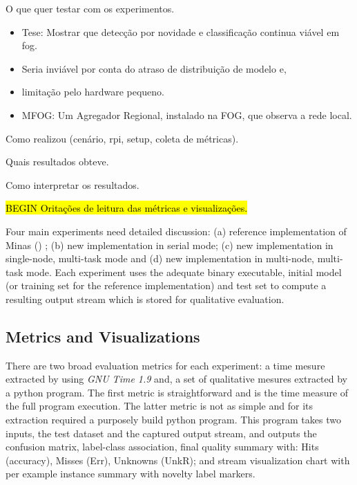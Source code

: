 \documentclass[conference]{IEEEtran}
\begin{document}

O que quer testar com os experimentos.
\begin{itemize}
  \item Tese: Mostrar que detecção por novidade e classificação continua viável em fog.
  \item Seria inviável por conta do atraso de distribuição de modelo e,
  \item limitação pelo hardware pequeno.
  \item MFOG: Um Agregador Regional, instalado na FOG, que observa a rede local.
\end{itemize}

Como realizou (cenário, rpi, setup, coleta de métricas).

Quais resultados obteve.

Como interpretar os resultados.

\hl{BEGIN Oritações de leitura das métricas e visualizações.}

Four main experiments need detailed discussion:
(a) reference implementation of Minas () \cite{Faria2016minas};
(b) new implementation in serial mode;
(c) new implementation in single-node, multi-task mode and
(d) new implementation in multi-node, multi-task mode.
Each experiment uses the adequate binary executable, initial model
(or training set for the reference implementation) and test set
to compute a resulting output stream which is stored for qualitative evaluation.

\subsection{Metrics and Visualizations}

There are two broad evaluation metrics for each experiment:
a time mesure extracted by using \emph{GNU Time 1.9} and,
a set of qualitative mesures extracted by a python program.
The first metric is straightforward and is the time measure of the full program execution.
The latter metric is not as simple and for its extraction required a
purposely build python program.
This program takes two inputs, the test dataset and the captured output stream,
and outputs the confusion matrix, label-class association,
final quality summary with: Hits (accuracy), Misses (Err), Unknowns (UnkR); and
stream visualization chart with per example instance summary with novelty label markers.
\end{document}
